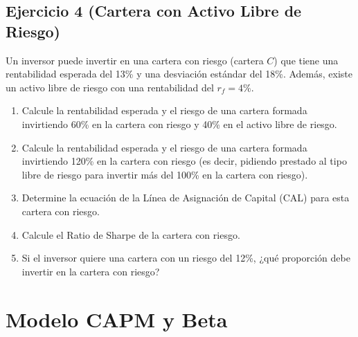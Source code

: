 \documentclass[12pt,a4paper]{article}
\newenvironment{ejercicio}[1]{\subsection*{Ejercicio #1}}{}
\begin{document}
\begin{ejercicio}{4 (Cartera con Activo Libre de Riesgo)}
Un inversor puede invertir en una cartera con riesgo (cartera $C$) que tiene una rentabilidad esperada del 13\% y una desviación estándar del 18\%. Además, existe un activo libre de riesgo con una rentabilidad del $r_f = 4\%$.

\begin{enumerate}[label=\alph*)]
  \item Calcule la rentabilidad esperada y el riesgo de una cartera formada invirtiendo 60\% en la cartera con riesgo y 40\% en el activo libre de riesgo.
  \item Calcule la rentabilidad esperada y el riesgo de una cartera formada invirtiendo 120\% en la cartera con riesgo (es decir, pidiendo prestado al tipo libre de riesgo para invertir más del 100\% en la cartera con riesgo).
  \item Determine la ecuación de la Línea de Asignación de Capital (CAL) para esta cartera con riesgo.
  \item Calcule el Ratio de Sharpe de la cartera con riesgo.
  \item Si el inversor quiere una cartera con un riesgo del 12\%, ¿qué proporción debe invertir en la cartera con riesgo?
\end{enumerate}
\end{ejercicio}

\section{Modelo CAPM y Beta}
\end{document}
